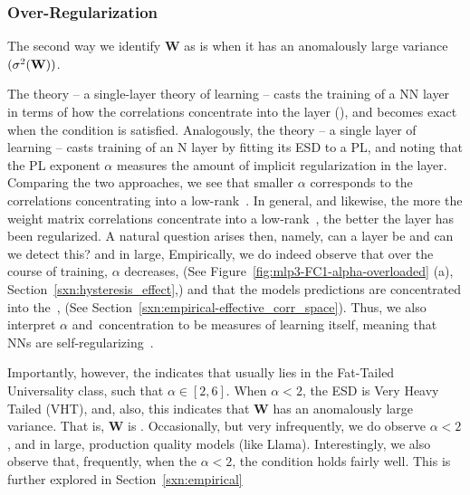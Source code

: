 \subsubsection{Over-Regularization}
\label{sxn:underfitting}


The second way we identify $\mathbf{W}$ as \ATypical is when it has an anomalously large variance $(\sigma^2({\mathbf{W}}))$.

The \SETOL theory -- a single-layer theory of learning -- casts the training 
of a NN layer in terms of how the correlations concentrate into the layer  \EffectiveCorrelationSpace (\ECS),
and becomes exact when the \TRACELOG condition is satisfied.
Analogously, the \HTSR theory -- a single layer \Phenomenology of learning -- casts training
of an N layer by fitting its ESD to a PL, and noting that the PL exponent $\alpha$ measures
the amount of implicit regularization in the layer.
Comparing the two approaches, we see that smaller $\alpha$ corresponds to the correlations
concentrating into a low-rank~\ECS.  In general, and likewise, the more the weight matrix
correlations concentrate  into a low-rank~\ECS, the better the layer has been regularized.
A natural question arises then, namely, can a layer be \emph{\OverRegularized} and
can we detect this?
and in large,
Empirically, we do indeed observe that over the course of training, $\alpha$ decreases, (See Figure~\ref{fig:mlp3-FC1-alpha-overloaded} 
(a), Section~\ref{sxn:hysteresis_effect},) and that the models predictions are concentrated into the~\ECS, 
(See Section~\ref{sxn:empirical-effective_corr_space}). Thus, we also interpret $\alpha$ and~\ECS concentration to be 
measures of learning itself, meaning that NNs are self-regularizing~\cite{MM18_TR_JMLRversion}.

Importantly, however, the \HTSR \Phenomenology indicates that \ALPHA usually lies in the Fat-Tailed Universality class,
such that $\alpha\in [2,6]$.  When $\alpha <2$, the ESD is Very Heavy Tailed (VHT), and, also,
this indicates that $\mathbf{W}$ has an anomalously large variance.  That is,  $\mathbf{W}$ is  \ATypical.
Occasionally, but very infrequently, we do observe $\alpha<2$, and in large, production quality models
(like Llama).
Interestingly, we also observe that, frequently, when the \HTSR $\alpha<2$, the \SETOL \TRACELOG
condition holds fairly well.  This is further explored in Section~\ref{sxn:empirical}

